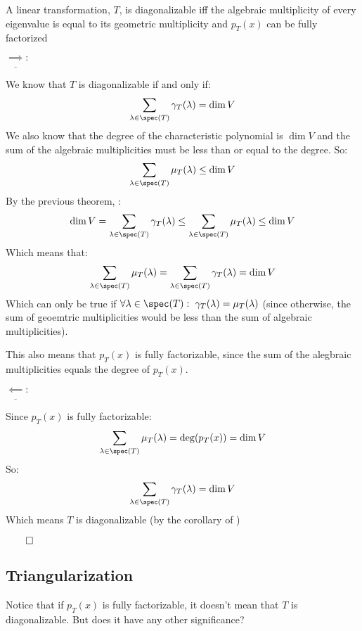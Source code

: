 \documentclass[10pt]{article}
\begin{document}
\begin{theorem}{A linear transformation, $T$, is diagonalizable iff the algebraic multiplicity of every eigenvalue is equal to its geometric multiplicity and $p_T(x)$ can be fully factorized}

$\underline{\implies}:$ \begin{minipage}[t]{\dimexpr\textwidth-2cm}

We know that $T$ is diagonalizable if and only if:
\[ \sum_{\lambda\in\spec(T)}\gamma_T(\lambda) = \dim V \] 
We also know that the degree of the characteristic polynomial is $\dim V$ and the sum of the algebraic multiplicities must be less than or equal to the degree. So:
\[ \sum_{\lambda\in\spec(T)} \mu_T(\lambda) \leq \dim V \]
By the previous theorem, :
\[ \dim V = \sum_{\lambda\in\spec(T)}\gamma_T(\lambda) \leq \sum_{\lambda\in\spec(T)} \mu_T(\lambda) \leq \dim V \]
Which means that:
\[ \sum_{\lambda\in\spec(T)} \mu_T(\lambda) = \sum_{\lambda\in\spec(T)}\gamma_T(\lambda) = \dim V\]
Which can only be true if $\forall\lambda\in\spec(T):~\gamma_T(\lambda)=\mu_T(\lambda)$ (since otherwise, the sum of geoemtric multiplicities would be less than the sum of algebraic multiplicities).

This also means that $p_T(x)$ is fully factorizable, since the sum of the alegbraic multiplicities equals the degree of $p_T(x)$.

\end{minipage}

\medskip

$\underline{\impliedby}:$ \begin{minipage}[t]{\dimexpr\textwidth-2cm}

Since $p_T(x)$ is fully factorizable:
\[ \sum_{\lambda\in\spec(T)} \mu_T(\lambda) = \deg(p_T(x)) = \dim V \]
So:
\[ \sum_{\lambda\in\spec(T)} \gamma_T(\lambda) = \dim V \]
Which means $T$ is diagonalizable (by the corollary of )

\end{minipage}

$\qed$

\end{theorem}

\newpage
\subsection{Triangularization}

Notice that if $p_T(x)$ is fully factorizable, it doesn't mean that $T$ is diagonalizable. But does it have any other significance? 
\end{document}

